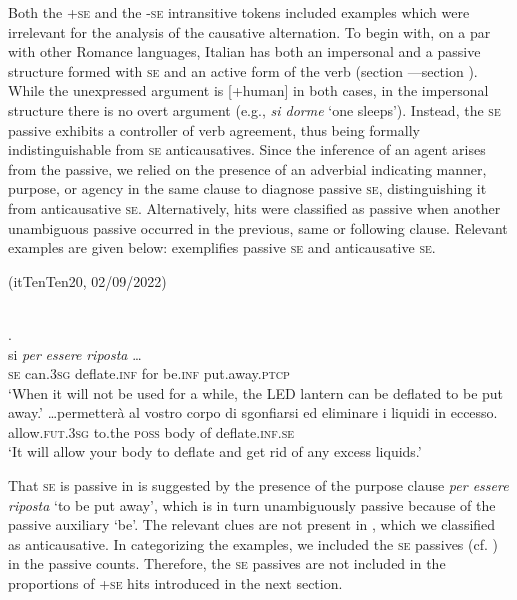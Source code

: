 \documentclass[output=paper,colorlinks,citecolor=brown
]{langscibook}
\begin{document}
Both the +\textsc{se} and the -\textsc{se} intransitive tokens included examples which were irrelevant for the analysis of the causative alternation. To begin with, on a par with other Romance languages, Italian has both an impersonal and a passive structure formed with \textsc{se} and an active form of the verb (section —section ). While the unexpressed argument is [+human] in both cases, in the impersonal structure there is no overt argument (e.g., \textit{si dorme} ‘one sleeps’). Instead, the \textsc{se} passive exhibits a controller of verb agreement, thus being formally indistinguishable from \textsc{se} anticausatives. Since the inference of an agent arises from the passive, we relied on the presence of an adverbial indicating manner, purpose, or agency in the same clause to diagnose passive \textsc{se}, distinguishing it from anticausative \textsc{se}. Alternatively, hits were classified as passive when another unambiguous passive occurred in the previous, same or following clause. Relevant examples are given below:  exemplifies passive \textsc{se} and  anticausative \textsc{se}.

\hspace*{\fill}(itTenTen20, 02/09/2022)\quad

\ea \label{bentley_example_3}
    \ea \label{bentley_example_3a}
     \\
    {}.\\
    \gll si   \textit{per} \textit{essere} \textit{riposta} \ldots  \\
    \textsc{se} can.3\textsc{sg} deflate.\textsc{inf} for be.\textsc{inf} put.away.\textsc{ptcp} \\
    \glt ‘When it will not be used for a while, the LED lantern can be deflated to be put away.’
    \ex \label{bentley_example_3b}
    \gll  \ldots  permetterà al vostro corpo di sgonfiarsi {ed eliminare i liquidi in eccesso.} \\
    allow.\textsc{fut}.3\textsc{sg} to.the \textsc{poss} body of deflate.\textsc{inf}.\textsc{se} {} \\
    \glt ‘It will allow your body to deflate and get rid of any excess liquids.’
    \z
\z

That \textsc{se} is passive in  is suggested by the presence of the purpose clause \textit{per essere riposta} ‘to be put away’, which is in turn unambiguously passive because of the passive auxiliary ‘be’. The relevant clues are not present in , which we classified as anticausative. In categorizing the examples, we included the \textsc{se} passives (cf. ) in the passive counts. Therefore, the \textsc{se} passives are not included in the proportions of +\textsc{se} hits introduced in the next section. 
\end{document}
